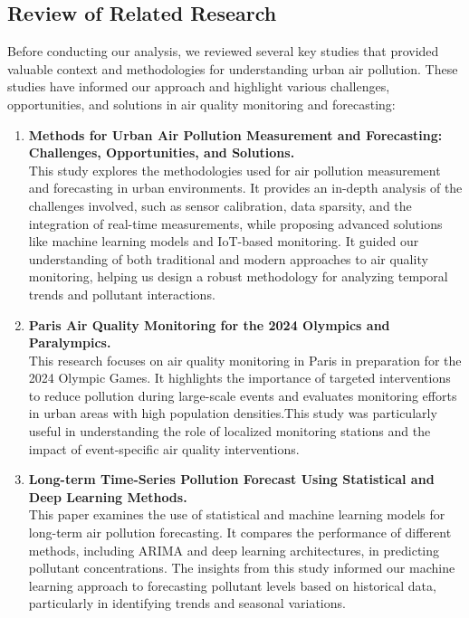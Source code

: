 \documentclass{modeleRapport}
\begin{document}
\newpage
\subsection{Review of Related Research}

Before conducting our analysis, we reviewed several key studies that provided valuable context and methodologies 
for understanding urban air pollution. These studies have informed our approach and highlight various challenges, 
opportunities, and solutions in air quality monitoring and forecasting:\\

\begin{enumerate}
    \item \textbf{Methods for Urban Air Pollution Measurement and Forecasting: Challenges, Opportunities, and Solutions.} \cite{UrbanAirPollutionMeasurement}\\
    This study explores the methodologies used for air pollution measurement and forecasting in urban environments. 
    It provides an in-depth analysis of the challenges involved, such as sensor calibration, data sparsity, and the 
    integration of real-time measurements, while proposing advanced solutions like machine learning models 
    and IoT-based monitoring. It guided our understanding of both traditional and modern approaches to air quality monitoring, 
    helping us design a robust methodology for analyzing temporal trends and pollutant interactions.\\
    \item \textbf{Paris Air Quality Monitoring for the 2024 Olympics and Paralympics.} \cite{ParisOlympicsPollutants}\\
    This research focuses on air quality monitoring in Paris in preparation for the 2024 Olympic Games. 
    It highlights the importance of targeted interventions to reduce pollution during large-scale events and evaluates 
    monitoring efforts in urban areas with high population densities.This study was particularly useful in understanding 
    the role of localized monitoring stations and the impact of event-specific air quality interventions.\\
    \item \textbf{Long-term Time-Series Pollution Forecast Using Statistical and Deep Learning Methods.} \cite{PollutantsForecase}\\
    This paper examines the use of statistical and machine learning models for long-term air pollution forecasting. 
    It compares the performance of different methods, including ARIMA and deep learning architectures, 
    in predicting pollutant concentrations. The insights from this study informed our machine learning 
    approach to forecasting pollutant levels based on historical data, particularly in identifying trends 
    and seasonal variations.\\
\end{enumerate}
\end{document}
